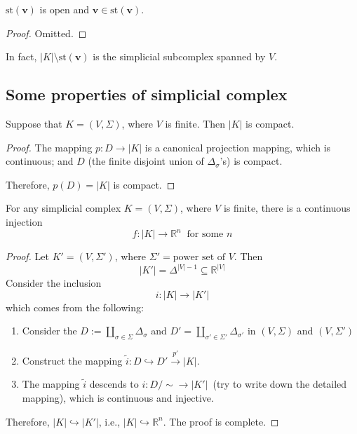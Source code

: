 \begin{proposition}
$\text{st}(\bm v)$ is open and $\bm v\in\text{st}(\bm v)$.
\end{proposition}
\begin{proof}
Omitted.
\end{proof}
In fact, $|K|\setminus\text{st}(\bm v)$ is the simplicial subcomplex spanned by $V$.

\subsection{Some properties of simplicial complex}

\begin{proposition}
Suppose that $K=(V,\Sigma)$, where $V$ is finite.
Then $|K|$ is compact.
\end{proposition}
\begin{proof}
The mapping $p:D\to|K|$ is a canonical projection mapping, which is continuous; and 
$D$ (the finite disjoint union of $\Delta_\sigma$'s) is compact.

Therefore, $p(D)=|K|$ is compact.
\end{proof}

\begin{proposition}
For any simplicial complex $K=(V,\Sigma)$, where $V$ is finite, there is a continuous injection
\[
f:|K|\to\mathbb{R}^n\ \text{ for some $n$}
\]
\end{proposition}
\begin{proof}
Let $K'=(V,\Sigma')$, where $\Sigma'=\text{power set of $V$}$. Then
\[
|K'| = \Delta^{|V|-1}\subseteq \mathbb{R}^{|V|}
\]
Consider the inclusion
\[
i:|K|\to|K'|
\]
which comes from the following:
\begin{enumerate}
\item
Consider the $D:=\coprod_{\sigma\in \Sigma}\Delta_{\sigma}$ and $D'=\coprod_{\sigma'\in \Sigma'}\Delta_{\sigma'}$ in $(V,\Sigma)$ and $(V,\Sigma')$
\item
Construct the mapping $\tilde{i}:D\hookrightarrow D'\xrightarrow{p'}|K|$.
\item
The mapping $\tilde{i}$ descends to $i:D/\sim\to|K'|$~(try to write down the detailed mapping), which is continuous and injective.
\end{enumerate}
Therefore, $|K|\hookrightarrow|K'|$, i.e., $|K|\hookrightarrow\mathbb{R}^n$.
The proof is complete.

\end{proof}














